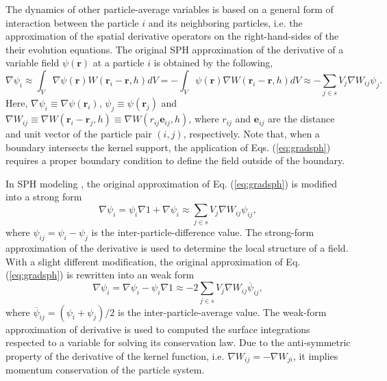\documentclass[12pt, a4paper,onecolumn]{article}
\newcommand{\br}{\mathbf{r}}
\begin{document}
The dynamics of other particle-average variables
is based on a general form of interaction between the particle $i$ and its neighboring particles,
i.e. the approximation of the spatial derivative operators on the right-hand-sides of the their evolution equations.
The original SPH approximation of the derivative of a variable field $\psi(\br)$ at a particle $i$  is obtained by 
the following,
%
\begin{equation}
\label{eq:gradsph}
\nabla \psi_i \approx \int_{V} \nabla \psi (\br) W(\br_i - \br, h) dV  
=  - \int_{V} \psi (\br) \nabla W(\br_i - \br, h) dV
\approx  - \sum_{j\in s}  V_j \nabla W_{ij}\psi_j . 
\end{equation}
%
Here, $\nabla \psi_i \equiv  \nabla \psi(\br_i)$, $\psi_j \equiv \psi (\br_j)$ 
and $\nabla W_{ij} \equiv \nabla W(\br_i - \br_j, h)\equiv \nabla W(r_{ij} \mathbf{e}_{ij}, h)$, 
where $r_{ij}$ and $\mathbf{e}_{ij}$ are the distance 
and unit vector of the particle pair $(i,j)$, respectively.
Note that, when a boundary intersects the kernel support, 
the application of Eqs. (\ref{eq:gradsph})
requires a proper boundary condition to define the field outside of the boundary.

In SPH modeling \cite{hu2015towards}, the original approximation of Eq. (\ref{eq:gradsph}) is modified into a strong form
%
\begin{equation}
\label{eq:gradsph-strong}
\nabla \psi_i = \psi_{i}\nabla 1 + \nabla \psi_i \approx   \sum_{j\in s} V_j \nabla W_{ij} \psi_{ij}, 
\end{equation}
%
where $\psi_{ij} = \psi_{i} - \psi_{j}$ is the inter-particle-difference value. 
The strong-form approximation of the derivative is used to determine the local structure of a field.
With a slight different modification, 
the original approximation of Eq. (\ref{eq:gradsph}) is rewritten into an weak form
%
\begin{equation}
\label{eq:gradsph-weak}
\nabla \psi_i = \nabla \psi_i - \psi_{i}\nabla 1 \approx   -2\sum_{j\in s}  V_j\nabla W_{ij} \overline{\psi}_{ij}, 
\end{equation}
%
where $\overline{\psi}_{ij} = \left(\psi_{i} + \psi_{j}\right)/2$ is the inter-particle-average value. 
The weak-form approximation of derivative is used to computed the surface integrations respected to a variable 
for solving its conservation law.
Due to the anti-symmetric property of the derivative of the kernel function, 
i.e. $\nabla W_{ij} = - \nabla W_{ji}$, it implies momentum conservation of the particle system.
%
\end{document}
